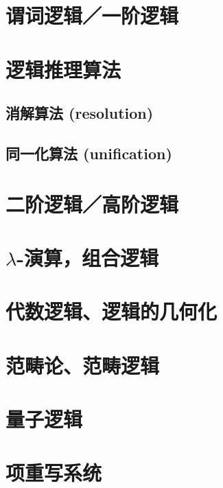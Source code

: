 \documentclass[12pt, a4paper]{report}
\newcommand{\cc}[2]{#1}
\newcommand{\cc}[2]{#2}
\theoremstyle{examples} \newtheorem{example}{Example}[section]
\begin{document}
	\section{\cc{谓词逻辑／一阶逻辑}{Predicate logic / first-order logic}}
	
	\section{\cc{逻辑推理算法}{Inference (classical)}}
	
		\subsection{\cc{消解算法 (resolution)}{Resolution algorithm}}
		\subsection{\cc{同一化算法 (unification)}{Unification algorithm}}
	
	\section{\cc{二阶逻辑／高阶逻辑}{Second-order / higher-order logic}}
	
	\section{\cc{$\lambda$-演算，组合逻辑}{$\lambda$-calculus, combinatory logic}}
	
	\section{\cc{代数逻辑、逻辑的几何化}{Algebraic logic, geometrization}}

	\section{\cc{范畴论、范畴逻辑}{Category theory, categorical logic}}
	
	\section{\cc{量子逻辑}{Quantum logic}}
	
	\section{\cc{项重写系统}{Term rewriting systems}}
	
\end{document}
